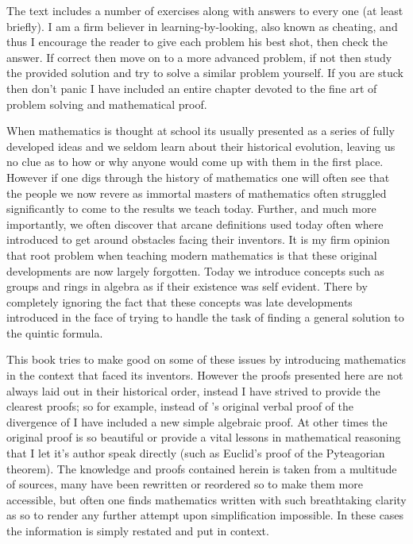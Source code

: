 The text includes a number of exercises along with answers to every one (at least briefly). I am a firm believer in learning-by-looking, also known as cheating, and thus I encourage the reader to give each problem his best shot, then check the answer. If correct then move on to a more advanced problem, if not then study the provided solution and try to solve a similar problem yourself. If you are stuck then don't panic I have included an entire chapter devoted to the fine art of problem solving and mathematical proof.

When mathematics is thought at school its usually presented as a series of fully developed ideas and we seldom learn about their historical evolution, leaving us no clue as to how or why anyone would come up with them in the first place. However if one digs through the history of mathematics one will often see that the people we now revere as immortal masters of mathematics often struggled significantly to come to the results we teach today. Further, and much more importantly, we often discover that arcane definitions used today often where introduced to get around obstacles facing their inventors. It is my firm opinion that root problem when teaching modern mathematics is that these original developments are now largely forgotten. Today we introduce concepts such as groups and rings in algebra as if their existence was self evident. There by completely ignoring the fact that these concepts was late developments introduced in the face of trying to handle the task of finding a general solution to the quintic formula.

This book tries to make good on some of these issues by introducing mathematics in the context that faced its inventors. However the proofs presented here are not always laid out in their historical order, instead I have strived to provide the clearest proofs; so for example, instead of 's original verbal proof of the divergence of  I have included a new simple algebraic proof. At other times the original proof is so beautiful or provide a vital lessons in mathematical reasoning that I let it's author speak directly (such as Euclid's proof of the Pyteagorian theorem).
The knowledge and proofs contained herein is taken from a multitude of sources, many have been rewritten or reordered so to make them more accessible, but often one finds mathematics written with such breathtaking clarity as so to render any further attempt upon simplification impossible. In these cases the information is simply restated and put in context.

